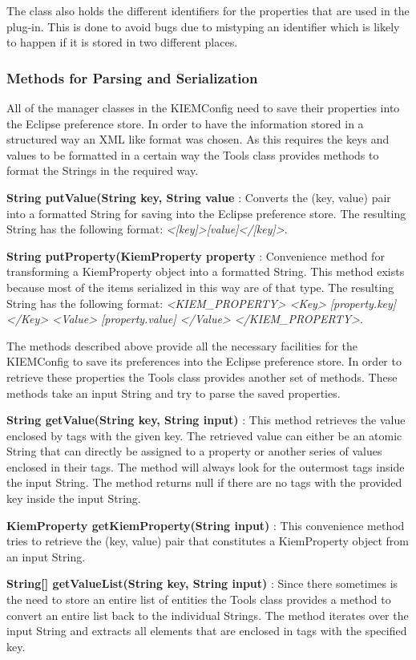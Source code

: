 The class also holds the different identifiers for the properties that are used in the plug-in. This is done
to avoid bugs due to mistyping an identifier which is likely to happen if it is stored in two different places.

\subsubsection{Methods for Parsing and Serialization}
\label{section:ToolsMethodsParsing}
All of the manager classes in the \ac{KIEMConfig} need to save their properties into the Eclipse preference store.
In order to have the information stored in a structured way an XML like format was chosen. As this requires the keys and values
to be formatted in a certain way the Tools class provides methods to format the Strings in the required way.
\begin{description}
 \item \textbf{String putValue(String key, String value} : Converts the (key, value) pair into a formatted String for saving
into the Eclipse preference store. The resulting String has the following format: 
\textit{<[key]>[value]</[key]>}.
 \item \textbf{String putProperty(KiemProperty property} : Convenience method for transforming a KiemProperty object into a
formatted String. This method exists because most of the items serialized in this way are of that type. The resulting String
has the following format: \textit{<KIEM_PROPERTY> <Key> [property.key] </Key> <Value> [property.value] </Value> </KIEM_PROPERTY>}.
\end{description}

The methods described above provide all the necessary facilities for the \ac{KIEMConfig} to save its preferences
into the Eclipse preference store. In order to retrieve these properties the Tools class provides another set of
methods. These methods take an input String and try to parse the saved properties.
\begin{description}
 \item \textbf{String getValue(String key, String input)} : This method retrieves the value enclosed by tags with
the given key. The retrieved value can either be an atomic String that can directly be assigned to a property or
another series of values enclosed in their tags. The method will always look for the outermost tags inside the
input String. The method returns null if there are no tags with the provided key inside the input String.
 \item \textbf{KiemProperty getKiemProperty(String input)} : This convenience method tries to retrieve the 
(key, value) pair that constitutes a KiemProperty object from an input String.
 \item \textbf{String[] getValueList(String key, String input)} : Since there sometimes is the need to store an entire
list of entities the Tools class provides a method to convert an entire list back to the individual Strings.
The method iterates over the input String and extracts all elements that are enclosed in tags with the specified key.
\end{description}



